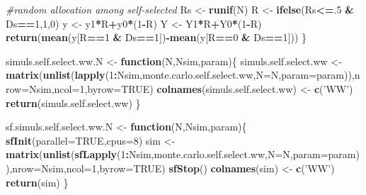 \documentclass[]{book}
\newenvironment{Shaded}{\begin{snugshade}}{\end{snugshade}}
\newcommand{\KeywordTok}[1]{\textcolor[rgb]{0.13,0.29,0.53}{\textbf{#1}}}
\newcommand{\DataTypeTok}[1]{\textcolor[rgb]{0.13,0.29,0.53}{#1}}
\newcommand{\DecValTok}[1]{\textcolor[rgb]{0.00,0.00,0.81}{#1}}
\newcommand{\StringTok}[1]{\textcolor[rgb]{0.31,0.60,0.02}{#1}}
\newcommand{\CommentTok}[1]{\textcolor[rgb]{0.56,0.35,0.01}{\textit{#1}}}
\newcommand{\OtherTok}[1]{\textcolor[rgb]{0.56,0.35,0.01}{#1}}
\newcommand{\ControlFlowTok}[1]{\textcolor[rgb]{0.13,0.29,0.53}{\textbf{#1}}}
\newcommand{\OperatorTok}[1]{\textcolor[rgb]{0.81,0.36,0.00}{\textbf{#1}}}
\newcommand{\NormalTok}[1]{#1}
\theoremstyle{definition}
\theoremstyle{definition}
\theoremstyle{definition}
\theoremstyle{remark}
\begin{document}
\begin{Shaded}
\begin{Highlighting}[]
  \CommentTok{#random allocation among self-selected}
\NormalTok{  Rs <-}\StringTok{ }\KeywordTok{runif}\NormalTok{(N)}
\NormalTok{  R <-}\StringTok{ }\KeywordTok{ifelse}\NormalTok{(Rs}\OperatorTok{<=}\NormalTok{.}\DecValTok{5} \OperatorTok{&}\StringTok{ }\NormalTok{Ds}\OperatorTok{==}\DecValTok{1}\NormalTok{,}\DecValTok{1}\NormalTok{,}\DecValTok{0}\NormalTok{)}
\NormalTok{  y <-}\StringTok{ }\NormalTok{y1}\OperatorTok{*}\NormalTok{R}\OperatorTok{+}\NormalTok{y0}\OperatorTok{*}\NormalTok{(}\DecValTok{1}\OperatorTok{-}\NormalTok{R)}
\NormalTok{  Y <-}\StringTok{ }\NormalTok{Y1}\OperatorTok{*}\NormalTok{R}\OperatorTok{+}\NormalTok{Y0}\OperatorTok{*}\NormalTok{(}\DecValTok{1}\OperatorTok{-}\NormalTok{R)}
  \KeywordTok{return}\NormalTok{(}\KeywordTok{mean}\NormalTok{(y[R}\OperatorTok{==}\DecValTok{1} \OperatorTok{&}\StringTok{ }\NormalTok{Ds}\OperatorTok{==}\DecValTok{1}\NormalTok{])}\OperatorTok{-}\KeywordTok{mean}\NormalTok{(y[R}\OperatorTok{==}\DecValTok{0} \OperatorTok{&}\StringTok{ }\NormalTok{Ds}\OperatorTok{==}\DecValTok{1}\NormalTok{]))}
\NormalTok{\}}

\NormalTok{simuls.self.select.ww.N <-}\StringTok{ }\ControlFlowTok{function}\NormalTok{(N,Nsim,param)\{}
\NormalTok{  simuls.self.select.ww <-}\StringTok{ }\KeywordTok{matrix}\NormalTok{(}\KeywordTok{unlist}\NormalTok{(}\KeywordTok{lapply}\NormalTok{(}\DecValTok{1}\OperatorTok{:}\NormalTok{Nsim,monte.carlo.self.select.ww,}\DataTypeTok{N=}\NormalTok{N,}\DataTypeTok{param=}\NormalTok{param)),}\DataTypeTok{nrow=}\NormalTok{Nsim,}\DataTypeTok{ncol=}\DecValTok{1}\NormalTok{,}\DataTypeTok{byrow=}\OtherTok{TRUE}\NormalTok{)}
  \KeywordTok{colnames}\NormalTok{(simuls.self.select.ww) <-}\StringTok{ }\KeywordTok{c}\NormalTok{(}\StringTok{'WW'}\NormalTok{)}
  \KeywordTok{return}\NormalTok{(simuls.self.select.ww)}
\NormalTok{\}}

\NormalTok{sf.simuls.self.select.ww.N <-}\StringTok{ }\ControlFlowTok{function}\NormalTok{(N,Nsim,param)\{}
  \KeywordTok{sfInit}\NormalTok{(}\DataTypeTok{parallel=}\OtherTok{TRUE}\NormalTok{,}\DataTypeTok{cpus=}\DecValTok{8}\NormalTok{)}
\NormalTok{  sim <-}\StringTok{ }\KeywordTok{matrix}\NormalTok{(}\KeywordTok{unlist}\NormalTok{(}\KeywordTok{sfLapply}\NormalTok{(}\DecValTok{1}\OperatorTok{:}\NormalTok{Nsim,monte.carlo.self.select.ww,}\DataTypeTok{N=}\NormalTok{N,}\DataTypeTok{param=}\NormalTok{param)),}\DataTypeTok{nrow=}\NormalTok{Nsim,}\DataTypeTok{ncol=}\DecValTok{1}\NormalTok{,}\DataTypeTok{byrow=}\OtherTok{TRUE}\NormalTok{)}
  \KeywordTok{sfStop}\NormalTok{()}
  \KeywordTok{colnames}\NormalTok{(sim) <-}\StringTok{ }\KeywordTok{c}\NormalTok{(}\StringTok{'WW'}\NormalTok{)}
  \KeywordTok{return}\NormalTok{(sim)}
\NormalTok{\}}


\end{Highlighting}
\end{Shaded}
\end{document}
